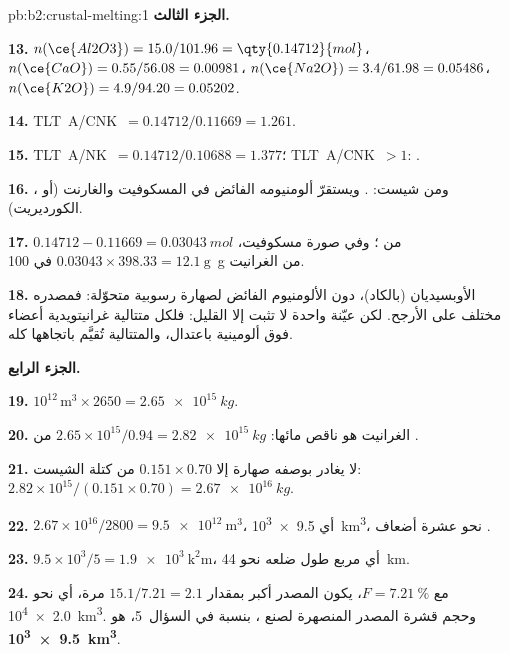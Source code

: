 \begin{solution}{pb:b2:crustal-melting:1}
\noindent\textbf{الجزء الثالث.}

\textbf{13.} $n(\ce{Al2O3}) = 15.0/101.96 = \qty{0.14712}{mol}$، $n(\ce{CaO}) =
0.55/56.08 = 0.00981$، $n(\ce{Na2O}) = 3.4/61.98 = 0.05486$، $n(\ce{K2O}) = 4.9/94.20 =
0.05202$.

\textbf{14.} \mbox{\textdir TLT A/CNK $= 0.14712/0.11669 = 1.261$}.

\textbf{15.} \mbox{\textdir TLT A/NK $= 0.14712/0.10688 = 1.377$}؛ \mbox{\textdir TLT A/CNK $> 1$}: .

\textbf{16.} ، ومن شيست: . ويستقرّ ألومنيومه الفائض في
المسكوفيت والغارنت (أو الكورديريت).

\textbf{17.} $0.14712 - 0.11669 = \qty{0.03043}{mol}$ من ؛ وفي صورة مسكوفيت،
$0.03043\times398.33 = \qty{12.1}{\gram}$ في \qty{100}{\gram} من الغرانيت.

\textbf{18.} الأوبسيديان  (بالكاد)، دون الألومنيوم الفائض لصهارة
رسوبية متحوّلة: فمصدره مختلف على الأرجح. لكن عيّنة واحدة لا تثبت إلا القليل:
فلكل متتالية غرانيتويدية أعضاء فوق ألومينية باعتدال، والمتتالية تُقيَّم باتجاهها
كله.

\noindent\textbf{الجزء الرابع.}

\textbf{19.} $10^{12}\,\unit{\cubic\metre}\times2650 = \qty{2.65e15}{kg}$.

\textbf{20.} الغرانيت هو  ناقص مائها: $2.65\times10^{15}/0.94 =
\qty{2.82e15}{kg}$ من .

\textbf{21.} لا يغادر بوصفه صهارة إلا $0.151\times0.70$ من كتلة الشيست:
$2.82\times10^{15}/(0.151\times0.70) = \qty{2.67e16}{kg}$.

\textbf{22.} $2.67\times10^{16}/2800 = \qty{9.5e12}{\cubic\metre}$، أي
\qty{9.5e3}{\cubic\kilo\metre}، نحو عشرة أضعاف .

\textbf{23.} $9.5\times10^3/5 = \qty{1.9e3}{\square\kilo\metre}$، أي مربع طول ضلعه نحو
\qty{44}{km}.

\textbf{24.} مع $F = \qty{7.21}{\percent}$، يكون المصدر أكبر بمقدار $15.1/7.21 = 2.1$ مرة،
أي نحو \qty{2.0e4}{\cubic\kilo\metre}. وحجم قشرة المصدر المنصهرة لصنع
، بنسبة  في السؤال~5، هو
\textbf{\qty[text-series-to-math=true]{9.5e3}{\cubic\kilo\metre}}.
\end{solution}
